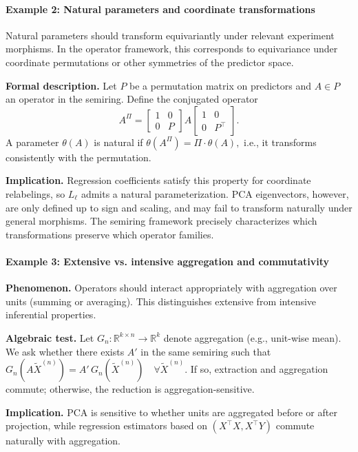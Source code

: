\paragraph{Example 2: Natural parameters and coordinate transformations}

Natural parameters should transform equivariantly under relevant experiment morphisms. In the operator framework, this corresponds to equivariance under coordinate permutations or other symmetries of the predictor space.

\textbf{Formal description.}
Let $P$ be a permutation matrix on predictors and $A \in P$ an operator in the semiring. Define the conjugated operator
\[
A^\Pi = \begin{bmatrix} 1 & 0 \\ 0 & P \end{bmatrix} A \begin{bmatrix} 1 & 0 \\ 0 & P^\top \end{bmatrix}.
\]
A parameter $\theta(A)$ is natural if $\theta(A^\Pi) = \Pi \cdot \theta(A),$ i.e., it transforms consistently with the permutation.

\textbf{Implication.}
Regression coefficients satisfy this property for coordinate relabelings, so $L_\ell$ admits a natural parameterization. PCA eigenvectors, however, are only defined up to sign and scaling, and may fail to transform naturally under general morphisms. The semiring framework precisely characterizes which transformations preserve which operator families.

\paragraph{Example 3: Extensive vs. intensive aggregation and commutativity}

\textbf{Phenomenon.}
Operators should interact appropriately with aggregation over units (summing or averaging). This distinguishes extensive from intensive inferential properties.

\textbf{Algebraic test.}
Let $G_n : \mathbb{R}^{k \times n} \to \mathbb{R}^k$ denote aggregation (e.g., unit-wise mean). We ask whether there exists $A'$ in the same semiring such that
$G_n(A \tilde X^{(n)}) = A' \, G_n(\tilde X^{(n)}) \quad \forall \tilde X^{(n)}.$
If so, extraction and aggregation commute; otherwise, the reduction is aggregation-sensitive.

\textbf{Implication.}
PCA is sensitive to whether units are aggregated before or after projection, while regression estimators based on $(X^\top X, X^\top Y)$ commute naturally with aggregation.


